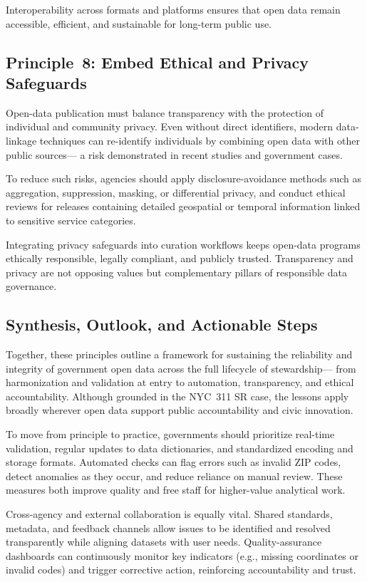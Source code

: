 \documentclass[linenumber]{jdsart}
\begin{document}
Interoperability across formats and platforms ensures that open data remain 
accessible, efficient, and sustainable for long-term public use.


\subsection{Principle~8: Embed Ethical and Privacy Safeguards}
\label{subsec:principle8}

Open-data publication must balance transparency with the protection of 
individual and community privacy.  
Even without direct identifiers, modern data-linkage techniques can 
re-identify individuals by combining open data with other public sources—%
a risk demonstrated in recent studies and government cases.  

To reduce such risks, agencies should apply disclosure-avoidance methods 
such as aggregation, suppression, masking, or differential privacy, and 
conduct ethical reviews for releases containing detailed geospatial or 
temporal information linked to sensitive service categories.  

Integrating privacy safeguards into curation workflows keeps open-data 
programs ethically responsible, legally compliant, and publicly trusted.  
Transparency and privacy are not opposing values but complementary 
pillars of responsible data governance.


\subsection{Synthesis, Outlook, and Actionable Steps}
\label{subsec:actions}
Together, these principles outline a framework for sustaining the reliability 
and integrity of government open data across the full lifecycle of stewardship—%
from harmonization and validation at entry to automation, transparency, and 
ethical accountability.  Although grounded in the \textsc{NYC~311 SR} case, the 
lessons apply broadly wherever open data support public accountability and 
civic innovation.

To move from principle to practice, governments should prioritize 
real-time validation, regular updates to data dictionaries, and standardized 
encoding and storage formats.  Automated checks can flag errors such as 
invalid ZIP codes, detect anomalies as they occur, and reduce reliance on 
manual review.  These measures both improve quality and free staff for 
higher-value analytical work.

Cross-agency and external collaboration is equally vital.  Shared standards, 
metadata, and feedback channels allow issues to be identified and resolved 
transparently while aligning datasets with user needs.  Quality-assurance 
dashboards can continuously monitor key indicators (e.g., missing coordinates 
or invalid codes) and trigger corrective action, reinforcing accountability 
and trust.
\end{document}
